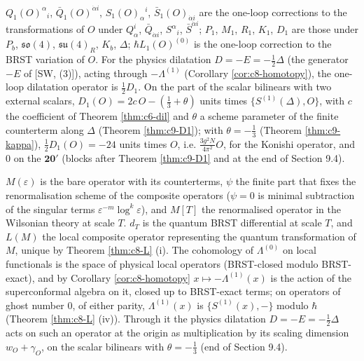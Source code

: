\begin{remark}
$Q_1(O)^\alpha{}_i$, $\bar Q_1(O)^{\dot\alpha i}$, $S_1(O)_\alpha{}^i$, $\bar S_1(O)_{\dot\alpha i}$ are the one-loop corrections to the transformations of $O$ under $Q^i_\alpha$, $\bar Q_{\dot\alpha i}$, $S^\alpha{}_i$, $\bar S^{\dot\alpha i}$; $P_1$, $M_1$, $R_1$, $K_1$, $D_1$ are those under $P_b$, $\mathfrak{so}(4)$, $\mathfrak{su}(4)_R$, $K_b$, $\Delta$; $\hbar L_1(O)^{(0)}$ is the one-loop correction to the BRST variation of $O$. For the physics dilatation $D=-E=-\tfrac12\Delta$ (the generator $-E$ of [SW, (3)]), acting through $-\Lambda^{(1)}$ (Corollary \ref{cor:c8-homotopy}), the one-loop dilatation operator is $\tfrac12D_1$. On the part of the scalar bilinears with two external scalars, $D_1(O)=2c\,O-(\tfrac13+\theta)$ units times $\{S^{(1)}(\Delta),O\}$, with $c$ the coefficient of Theorem \ref{thm:c6-dil} and $\theta$ a scheme parameter of the finite counterterm along $\Delta$ (Theorem \ref{thm:c9-D1}); with $\theta=-\tfrac13$ (Theorem \ref{thm:c9-kappa}), $\tfrac12D_1(O)=-24$ units times $O$, i.e. $\frac{3g^2N}{4\pi^2}O$, for the Konishi operator, and $0$ on the $\mathbf{20'}$ (blocks after Theorem \ref{thm:c9-D1} and at the end of Section 9.4).
\end{remark}

\begin{remark}
$M(\varepsilon)$ is the bare operator with its counterterms, $\psi$ the finite part that fixes the renormalisation scheme of the composite operators ($\psi=0$ is minimal subtraction of the singular terms $\varepsilon^{-m}\log^k\varepsilon$), and $M[T]$ the renormalised operator in the Wilsonian theory at scale $T$. $d_T$ is the quantum BRST differential at scale $T$, and $L(M)$ the local composite operator representing the quantum transformation of $M$, unique by Theorem \ref{thm:c8-L} (i). The cohomology of $\Lambda^{(0)}$ on local functionals is the space of physical local operators (BRST-closed modulo BRST-exact), and by Corollary \ref{cor:c8-homotopy} $x\mapsto-\Lambda^{(1)}(x)$ is the action of the superconformal algebra on it, closed up to BRST-exact terms; on operators of ghost number $0$, of either parity, $\Lambda^{(1)}(x)$ is $\{S^{(1)}(x),-\}$ modulo $\hbar$ (Theorem \ref{thm:c8-L} (iv)). Through it the physics dilatation $D=-E=-\tfrac12\Delta$ acts on such an operator at the origin as multiplication by its scaling dimension $w_O+\gamma_O$, on the scalar bilinears with $\theta=-\tfrac13$ (end of Section 9.4).
\end{remark}

